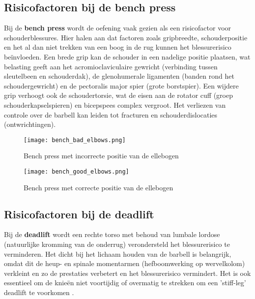 \subsection{Risicofactoren bij de bench press}
\label{subsec:risicofactoren-bench-press}
Bij de \textbf{bench press} wordt de oefening vaak gezien als een risicofactor voor schouderblessures. 
Hier halen \textcite{BengtssonEtAl2018} aan dat factoren zoals gripbreedte, schouderpositie en het al dan niet trekken van een boog in de rug kunnen het blessurerisico beïnvloeden. 
Een brede grip kan de schouder in een nadelige positie plaatsen, wat belasting geeft aan het acromioclaviculaire gewricht (verbinding tussen sleutelbeen en schouderdak), de glenohumerale ligamenten (banden rond het schoudergewricht) en de pectoralis major spier (grote borstspier). 
Een wijdere grip verhoogt ook de schoudertorsie, wat de eisen aan de rotator cuff (groep schouderkapselspieren) en bicepspees complex vergroot. 
Het verliezen van controle over de barbell kan leiden tot fracturen en schouderdislocaties (ontwrichtingen).

\begin{figure}[h]
  \centering
  \begin{minipage}{0.45\textwidth}
      \centering
      \texttt{[image: bench\_bad\_elbows.png]}
      \caption[Bench press met incorrecte positie van de ellebogen]{\label{fig:bench_incorrect}Bench press met incorrecte positie van de ellebogen \autocite{Ronai2018}}
  \end{minipage}
  \hfill %
  \begin{minipage}{0.45\textwidth}
      \centering
      \texttt{[image: bench\_good\_elbows.png]}
      \caption[Bench press met correcte positie van de ellebogen]{\label{fig:bench_correct}Bench press met correcte positie van de ellebogen \autocite{Ronai2018}}
  \end{minipage}
\end{figure}    

\subsection{Risicofactoren bij de deadlift}
\label{subsec:risicofactoren-deadlift}
Bij de \textbf{deadlift} wordt een rechte torso met behoud van lumbale lordose (natuurlijke kromming van de onderrug) verondersteld het blessurerisico te verminderen. 
Het dicht bij het lichaam houden van de barbell is belangrijk, omdat dit de heup- en spinale momentarmen (hefboomwerking op wervelkolom) verkleint en zo de prestaties verbetert en het blessurerisico vermindert. 
Het is ook essentieel om de knieën niet voortijdig of overmatig te strekken om een 'stiff-leg' deadlift te voorkomen \autocite{BengtssonEtAl2018}.

